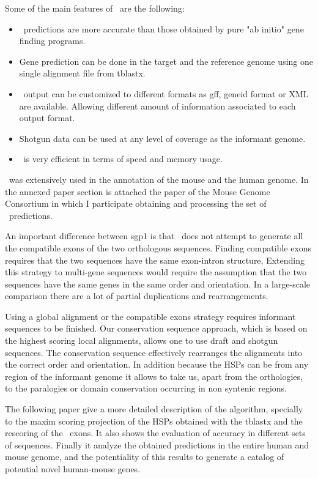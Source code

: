 Some of the main features of \sgp\ are the following:

\begin{itemize}

\item  \sgp\ predictions are more accurate than those obtained by 
pure "ab initio" gene finding programs.

\item Gene prediction can be done in the target and the reference 
genome using one single alignment file from tblastx.

\item \sgp\ output can be customized to different formats as gff, 
geneid format or XML are available. Allowing different amount of
information associated to each output format.

\item Shotgun data can be used at any level of coverage as the informant
genome.

\item  \sgp\ is very efficient in terms of speed and memory usage.
\end{itemize}

\sgp\ was extensively used in the annotation of the mouse and the human
genome. In the annexed paper section is attached the paper of the Mouse
Genome Consortium in which I participate obtaining and processing the
set of \sgp\ predictions. 

An important difference between sgp1 is that \sgp\ does not attempt to
generate all the compatible exons of the two orthologous
sequences. Finding compatible exons requires that the two sequences
have the same exon-intron structure, Extending this strategy to
multi-gene sequences would require the assumption that the two
sequences have the same genes in the same order and orientation. In a
large-scale comparison there are a lot of partial duplications and
rearrangements.

Using a global alignment or the compatible exons strategy requires
informant sequences to be finished. Our conservation sequence
approach, which is based on the highest scoring local alignments,
allows one to use draft and shotgun sequences. The conservation
sequence effectively rearranges the alignments into the correct order
and orientation. In addition because the HSPs can be from any region
of the informant genome it allows to take us, apart from the orthologies,
to the paralogies or domain conservation occurring in non syntenic
regions.

The following paper give a more detailed description of the algorithm,
specially to the maxim scoring projection of the HSPs obtained with
the tblastx and the rescoring of the \geneid\ exons.  It also shows the
evaluation of accuracy in different sets of sequences. Finally it
analyze the obtained predictions in the entire human and mouse genome,
and the potentiality of this results to generate a catalog of
potential novel human-mouse genes.

